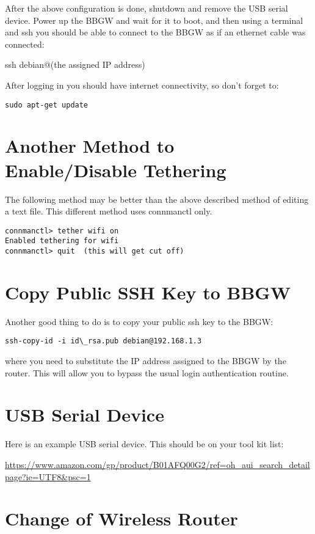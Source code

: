After the above configuration is done, shutdown and remove the USB serial 
device.
Power up the BBGW and wait for it to boot, and then using a terminal and ssh 
you should be able to connect to the BBGW as if an ethernet cable was connected:

ssh debian@(the assigned IP address)

After logging in you should have internet connectivity, so don't forget to:

\begin{verbatim}
sudo apt-get update
\end{verbatim}

\section{Another Method to Enable/Disable Tethering}

The following method may be better than the above described method of editing a text file.  This different method uses connmanctl only.

\begin{verbatim}
connmanctl> tether wifi on
Enabled tethering for wifi
connmanctl> quit  (this will get cut off)
\end{verbatim}

\section{Copy Public SSH Key to BBGW}

Another good thing to do is to copy your public ssh key to the BBGW:

\begin{verbatim}
ssh-copy-id -i id\_rsa.pub debian@192.168.1.3
\end{verbatim}

where you need to substitute the IP address assigned to the BBGW by the 
router.  This will allow you to bypass the usual login authentication routine.

\section{USB Serial Device}

Here is an example USB serial device.  This should be on your tool kit list:

\url{https://www.amazon.com/gp/product/B01AFQ00G2/ref=oh_aui_search_detailpage?ie=UTF8&psc=1}

\section{Change of Wireless Router}

